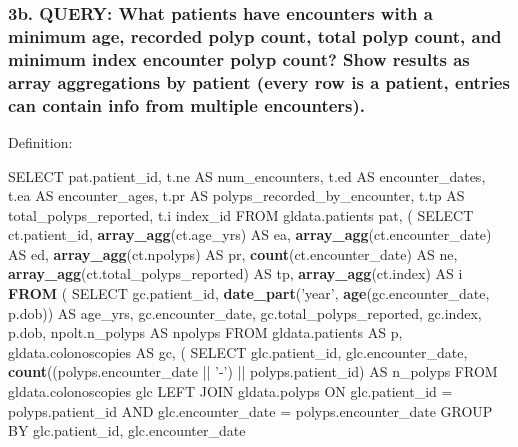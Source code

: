 \documentclass[]{article}
\newenvironment{Shaded}{\begin{snugshade}}{\end{snugshade}}
\newcommand{\KeywordTok}[1]{\textcolor[rgb]{0.13,0.29,0.53}{\textbf{{#1}}}}
\newcommand{\DataTypeTok}[1]{\textcolor[rgb]{0.13,0.29,0.53}{{#1}}}
\newcommand{\StringTok}[1]{\textcolor[rgb]{0.31,0.60,0.02}{{#1}}}
\newcommand{\NormalTok}[1]{{#1}}
\begin{document}
\subsubsection{3b. QUERY: What patients have encounters with a minimum
age, recorded polyp count, total polyp count, and minimum index
encounter polyp count? Show results as array aggregations by patient
(every row is a patient, entries can contain info from multiple
encounters).}\label{b.-query-what-patients-have-encounters-with-a-minimum-age-recorded-polyp-count-total-polyp-count-and-minimum-index-encounter-polyp-count-show-results-as-array-aggregations-by-patient-every-row-is-a-patient-entries-can-contain-info-from-multiple-encounters.}

Definition:

\begin{Shaded}
\begin{Highlighting}[]
\NormalTok{SELECT pat.patient_id,}
\NormalTok{t.ne AS num_encounters,}
\NormalTok{t.ed AS encounter_dates,}
\NormalTok{t.ea AS encounter_ages,}
\NormalTok{t.pr AS polyps_recorded_by_encounter,}
\NormalTok{t.tp AS total_polyps_reported,}
\NormalTok{t.i index_id}
\NormalTok{FROM gldata.patients pat,}
\NormalTok{( SELECT ct.patient_id,}
  \KeywordTok{array_agg}\NormalTok{(ct.age_yrs) AS ea,}
  \KeywordTok{array_agg}\NormalTok{(ct.encounter_date) AS ed,}
  \KeywordTok{array_agg}\NormalTok{(ct.npolyps) AS pr,}
  \KeywordTok{count}\NormalTok{(ct.encounter_date) AS ne,}
  \KeywordTok{array_agg}\NormalTok{(ct.total_polyps_reported) AS tp,}
  \KeywordTok{array_agg}\NormalTok{(ct.index) AS i}
  \KeywordTok{FROM} \NormalTok{( SELECT gc.patient_id,}
         \KeywordTok{date_part}\NormalTok{(}\StringTok{'year'}\NormalTok{, }\KeywordTok{age}\NormalTok{(gc.encounter_date, p.dob)) AS age_yrs,}
         \NormalTok{gc.encounter_date,}
         \NormalTok{gc.total_polyps_reported,}
         \NormalTok{gc.index,}
         \NormalTok{p.dob,}
         \NormalTok{npolt.n_polyps AS npolyps}
         \NormalTok{FROM gldata.patients AS p,}
         \NormalTok{gldata.colonoscopies AS gc,}
         \NormalTok{( SELECT glc.patient_id,}
           \NormalTok{glc.encounter_date,}
           \KeywordTok{count}\NormalTok{((polyps.encounter_date ||}\StringTok{ '-'}\NormalTok{) ||}\StringTok{ }\NormalTok{polyps.patient_id) AS n_polyps}
           \NormalTok{FROM gldata.colonoscopies glc}
           \NormalTok{LEFT JOIN gldata.polyps ON }\DataTypeTok{glc.patient_id =} \NormalTok{polyps.patient_id AND }\DataTypeTok{glc.encounter_date =} \NormalTok{polyps.encounter_date}
           \NormalTok{GROUP BY glc.patient_id, glc.encounter_date}

\end{Highlighting}
\end{Shaded}
\end{document}
